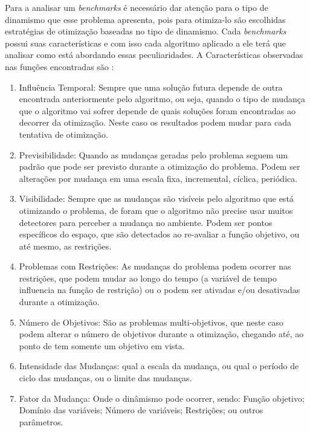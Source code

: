 Para a analisar um \textit{benchmarks} é necessário dar atenção para o tipo de dinamismo que esse problema apresenta, pois para otimiza-lo são escolhidas estratégias de otimização baseadas no tipo de dinamismo. Cada \textit{benchmarks} possui suas características e com isso cada algoritmo aplicado a ele terá que analisar como está abordando essas peculiaridades. A Características observadas nas funções encontradas são \cite{cruz2011optimization}:

\begin{enumerate}
\item Influência Temporal: Sempre que uma solução futura depende de outra encontrada anteriormente pelo algoritmo, ou seja, quando o tipo de mudança que o algoritmo vai sofrer depende de quais soluções foram encontradas ao decorrer da otimização. Neste caso os resultados podem mudar para cada tentativa de otimização.

\item Previsibilidade: Quando as mudanças geradas pelo problema seguem um padrão que pode ser previsto durante a otimização do problema. Podem ser alterações por mudança em uma escala fixa, incremental, cíclica, periódica.

\item Visibilidade: Sempre que as mudanças são visíveis pelo algoritmo que está otimizando o problema, de foram que o algoritmo não precise usar muitos detectores para perceber a mudança no ambiente. Podem ser pontos específicos do espaço, que são detectados ao re-avaliar a função objetivo, ou até mesmo, as restrições.

\item Problemas com Restrições: As mudanças do problema podem ocorrer nas restrições, que podem mudar ao longo do tempo (a variável de tempo influencia na função de restrição) ou o podem ser ativadas e/ou desativadas durante a otimização.

\item Número de Objetivos: São as problemas multi-objetivos, que neste caso podem alterar o número de objetivos durante a otimização, chegando até, ao ponto de tem somente um objetivo em vista.

\item Intensidade das Mudanças: qual a escala da mudança, ou qual o período de ciclo das mudanças, ou o limite das mudanças.

\item Fator da Mudança: Onde o dinâmismo pode ocorrer, sendo: Função objetivo; Domínio das variáveis; Número de variáveis; Restrições; ou outros parâmetros.  
\end{enumerate}

